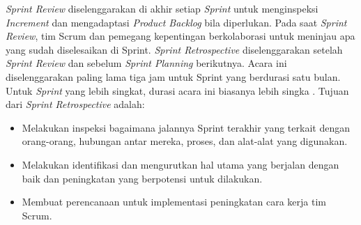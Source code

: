 \par \textit{Sprint Review} diselenggarakan di akhir setiap \textit{Sprint} untuk menginspeksi \textit{Increment} dan mengadaptasi \textit{Product Backlog} bila diperlukan. Pada saat \textit{Sprint Review}, tim Scrum dan pemegang kepentingan berkolaborasi untuk meninjau apa yang sudah   diselesaikan di Sprint. \textit{Sprint Retrospective} diselenggarakan setelah \textit{Sprint Review} dan sebelum \textit{Sprint Planning} berikutnya. Acara ini diselenggarakan paling lama tiga jam untuk Sprint yang berdurasi satu bulan. Untuk \textit{Sprint} yang lebih singkat, durasi acara ini biasanya lebih singka \citep{sutherlandpanduan}. Tujuan dari \textit{Sprint Retrospective} adalah:
\begin{itemize}
	\itemsep0em
	\item Melakukan inspeksi bagaimana jalannya Sprint terakhir yang terkait dengan orang-orang, hubungan antar mereka, proses, dan alat-alat yang digunakan.
	\item Melakukan identifikasi dan mengurutkan hal utama yang berjalan dengan baik dan peningkatan yang berpotensi untuk dilakukan.
	\item Membuat perencanaan untuk implementasi peningkatan cara kerja tim Scrum.
\end{itemize}
 

